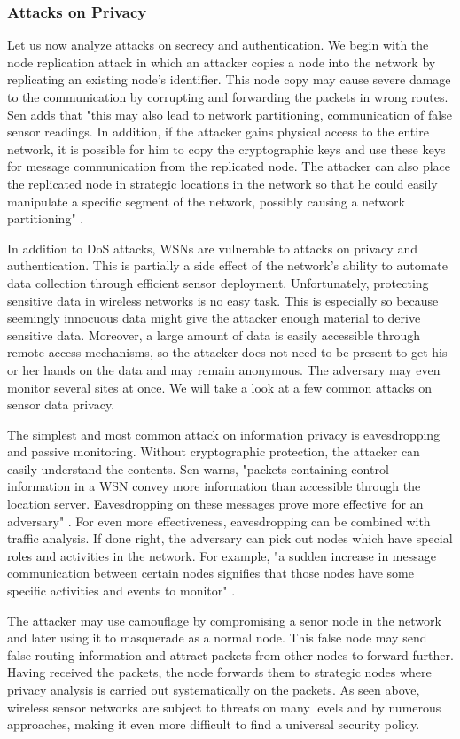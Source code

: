 \documentclass[12pt,a4paper,twoside]{report}
\begin{document}
\subsubsection{Attacks on Privacy}
Let us now analyze attacks on secrecy and authentication. We begin with the node replication attack in which an attacker copies a node into the network by replicating an existing node's identifier. This node copy may cause severe damage to the communication by corrupting and forwarding the packets in wrong routes. Sen adds that "this may also lead to network partitioning, communication of false sensor readings. In addition, if the attacker gains physical access to the entire network, it is possible for him to copy the cryptographic keys and use these keys for message communication from the replicated node. The attacker can also place the replicated node in strategic locations in the network so that he could easily manipulate a specific segment of the network, possibly causing a network partitioning" \cite{sen:2009}.\par
In addition to DoS attacks, WSNs are vulnerable to attacks on privacy and authentication. This is partially a side effect of the network's ability to automate data collection through efficient sensor deployment. Unfortunately, protecting sensitive data in wireless networks is no easy task. This is especially so because seemingly innocuous data might give the attacker enough material to derive sensitive data. Moreover, a large amount of data is easily accessible through remote access mechanisms, so the attacker does not need to be present to get his or her hands on the data and may remain anonymous. The adversary may even monitor several sites at once.  We will take a look at a few common attacks on sensor data privacy.\par
The simplest and most common attack on information privacy is eavesdropping and passive monitoring. Without cryptographic protection, the attacker can easily understand the contents. Sen warns, "packets containing control information in a WSN convey more information than accessible through the location server. Eavesdropping on these messages prove more effective for an adversary" \cite{sen:2009}. For even more effectiveness, eavesdropping can be combined with traffic analysis. If done right, the adversary can pick out nodes which have special roles and activities in the network. For example, "a sudden increase in message communication between certain nodes signifies that those nodes have some specific activities and events to monitor" \cite{sen:2009}. \par
The attacker may use camouflage by compromising a senor node in the network and later using it to masquerade as a normal node. This false node may send false routing information and attract packets from other nodes to forward further. Having received the packets, the node forwards them to strategic nodes where privacy analysis is carried out systematically on the packets. As seen above, wireless sensor networks are subject to threats on many levels and by numerous approaches, making it even more difficult to find a universal security policy.\par
\end{document}
